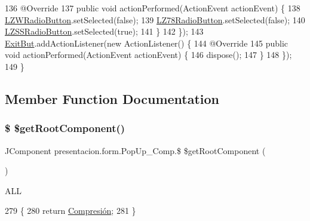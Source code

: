 \begin{DoxyCode}
136             @Override
137             \textcolor{keyword}{public} \textcolor{keywordtype}{void} actionPerformed(ActionEvent actionEvent) \{
138                 \hyperlink{classpresentacion_1_1form_1_1PopUp__Comp_a810fe251f9c88e3b83ce466feafafe2e}{LZWRadioButton}.setSelected(\textcolor{keyword}{false});
139                 \hyperlink{classpresentacion_1_1form_1_1PopUp__Comp_ac750ecbde516e2fee470693124d2ff63}{LZ78RadioButton}.setSelected(\textcolor{keyword}{false});
140                 \hyperlink{classpresentacion_1_1form_1_1PopUp__Comp_ad18c1029f04cc43d033183dca943977c}{LZSSRadioButton}.setSelected(\textcolor{keyword}{true});
141             \}
142         \});
143         \hyperlink{classpresentacion_1_1form_1_1PopUp__Comp_aad0de868daa06f82567784941064f12d}{ExitBut}.addActionListener(\textcolor{keyword}{new} ActionListener() \{
144             @Override
145             \textcolor{keyword}{public} \textcolor{keywordtype}{void} actionPerformed(ActionEvent actionEvent) \{
146                 dispose();
147             \}
148         \});
149     \}
\end{DoxyCode}


\subsection{Member Function Documentation}
\mbox{\label{classpresentacion_1_1form_1_1PopUp__Comp_a8f22f1163ae09f7b29cf322670530af9}} 
\subsubsection{\texorpdfstring{\$ \$get\+Root\+Component()}{$ $getRootComponent()}}
{\footnotesize\ttfamily J\+Component presentacion.\+form.\+Pop\+Up\+\_\+\+Comp.\$ \$get\+Root\+Component (\begin{DoxyParamCaption}{ }\end{DoxyParamCaption})\hspace{0.3cm}{\ttfamily [inline]}}

A\+LL 
\begin{DoxyCode}
279                                                \{
280         \textcolor{keywordflow}{return} \hyperlink{classpresentacion_1_1form_1_1PopUp__Comp_a5769b499f21466bae765c41428512966}{Compresión};
281     \}
\end{DoxyCode}
\mbox{\label{classpresentacion_1_1form_1_1PopUp__Comp_a6742ee8edc772104c5d78f3eb5888b49}} 
